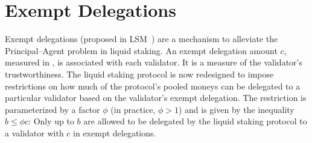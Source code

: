 \section{Exempt Delegations}

Exempt delegations (proposed in LSM~\cite{liquidity-staking-module})
are a mechanism to alleviate the Principal--Agent problem in liquid staking.
An exempt delegation amount $c$, measured in \asset, is associated
with each validator. It is a measure of the validator's trustworthiness.
The liquid staking protocol is now redesigned to impose restrictions
on how much of the protocol's pooled moneys can be delegated to a particular
validator based on the validator's exempt delegation.
The restriction is
parameterized by a factor $\phi$ (in practice, $\phi > 1$)
and is given by the inequality $b \leq \phi c$: Only up to $b$ \assets
are allowed to be delegated by the liquid staking protocol
to a validator with $c$ \assets in exempt delegations.

